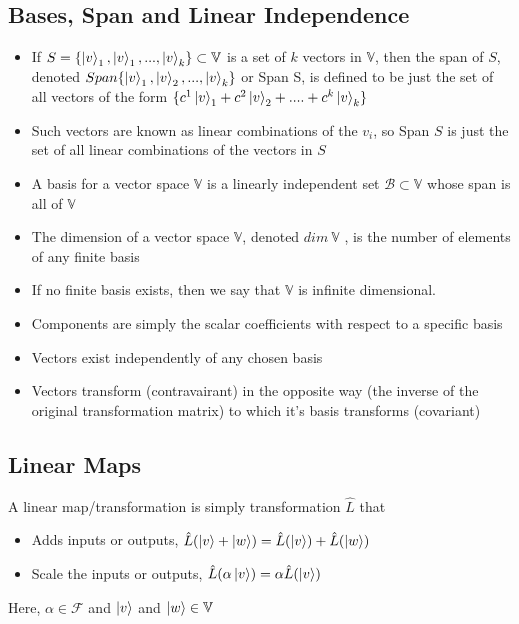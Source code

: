\subsection{Bases, Span and Linear Independence}
\begin{itemize}
    \item If $S = \{\ket{v}_{1},\ket{v}_{1},...,\ket{v}_{k}\} \subset \mathbb{V}$ is a set of $k$ vectors in $\mathbb{V}$, then the span of $S$, denoted $Span \{\ket{v}_{1},\ket{v}_{2},...,\ket{v}_{k} \}$ or Span S, is defined to be just the set of all vectors of the form $\{c^{1}\ket{v}_{1} + c^{2}\ket{v}_{2} + .... + c^{k}\ket{v}_{k} \}$
    \item Such vectors are known as linear combinations of the $v_i$, so Span $S$ is just the set of all linear combinations of the vectors in $S$
    \item A basis for a vector space $\mathbb{V}$ is a linearly independent set $\mathcal{B} \subset \mathbb{V}$ whose span is all of $\mathbb{V}$
    \item The dimension of a vector space $\mathbb{V}$, denoted $dim \ \mathbb{V}$ , is the number of
elements of any finite basis
\item If no finite basis exists, then we say that $\mathbb{V}$ is infinite dimensional.
\item Components are simply the scalar coefficients with respect to a specific basis
\item Vectors exist independently of any chosen basis
\item Vectors transform (contravairant) in the opposite way (the inverse of the original transformation matrix) to which it's basis transforms (covariant)
\end{itemize}

\subsection{Linear Maps}
A linear map/transformation is simply transformation $\hat{L}$ that
		\begin{itemize}
				\item Adds inputs or outputs, $\hat{L}(\ket{v} + \ket{w}) = \hat{L}(\ket{v}) + \hat{L}(\ket{w})$
			\item Scale the inputs or outputs, $\hat{L}(\alpha \ket{v}) = \alpha \hat{L}(\ket{v})$
		\end{itemize}
		Here, $\alpha  \in \mathcal{F}$ and $\ket{v} $ and $\ket{w} \in \mathbb{V}$
